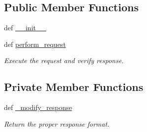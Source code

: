 \subsection*{Public Member Functions}
\begin{DoxyCompactItemize}
\item 
def \hyperlink{classsrc_1_1rapp__http__request__handler_1_1RappHttpRequestHandler_a75a470e8da96e04dccafa18712377002}{\-\_\-\-\_\-init\-\_\-\-\_\-}
\item 
def \hyperlink{classsrc_1_1rapp__http__request__handler_1_1RappHttpRequestHandler_ad31de831e16f7c95521801e00c064d93}{perform\-\_\-request}
\begin{DoxyCompactList}\small\item\em Execute the request and verify response. \end{DoxyCompactList}\end{DoxyCompactItemize}
\subsection*{Private Member Functions}
\begin{DoxyCompactItemize}
\item 
def \hyperlink{classsrc_1_1rapp__http__request__handler_1_1RappHttpRequestHandler_a58490e8f6850655b116b9ebca531b340}{\-\_\-modify\-\_\-response}
\begin{DoxyCompactList}\small\item\em Return the proper response format. \end{DoxyCompactList}\end{DoxyCompactItemize}
